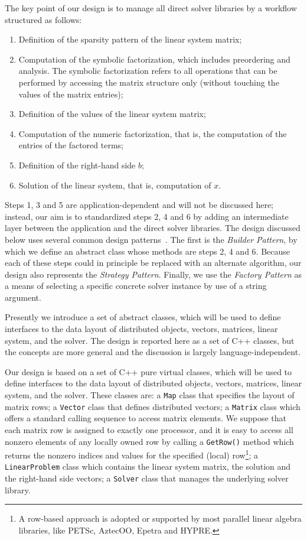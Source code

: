 \documentclass{llncs}
\begin{document}
The key point of our design is to manage all direct solver libraries by a
workflow structured as follows:
\begin{enumerate}
\item Definition of the sparsity pattern of the linear system matrix;
\item Computation of the symbolic factorization, which includes
preordering and analysis. The
symbolic factorization refers to all operations that can be performed by
accessing the matrix structure only (without touching the values of the matrix entries);
\item Definition of the values of the linear system matrix;
\item Computation of the numeric factorization, that is, the computation
of the entries of the factored terms;
\item Definition of the right-hand side $b$;
\item Solution of the linear system, that is, computation of $x$.
\end{enumerate}
Steps 1, 3 and 5 are application-dependent and will not be discussed
here; instead, our aim is to standardized steps 2, 4 and
6  by adding an intermediate layer between the application and
the direct solver libraries.  The design discussed below uses
several common design patterns~\cite{Gamma}.  The first is the
\textit{Builder Pattern}, by which we define an abstract class whose
methods are steps 2, 4 and 6.  Because each of these steps could in
principle be replaced with an alternate algorithm, our design also
represents the \textit{Strategy Pattern}. Finally, we use the
\textit{Factory Pattern} as a means of selecting a specific concrete
solver instance by use of a string argument.

Presently we introduce a set of abstract classes, which will be used
to define interfaces to the data layout of distributed objects,
vectors, matrices, linear system, and the solver. The design is
reported here as a set of C++ classes, but the concepts are more
general and the discussion is largely language-independent.

Our design is based on a set of C++ pure virtual classes, which will be
used to define interfaces to the data layout of distributed objects, 
vectors, matrices, linear system, and the solver. These classes are:
a {\tt Map} class that specifies the layout of matrix rows;
a {\tt Vector} class that defines distributed vectors;
a {\tt Matrix} class which offers a standard calling sequence to access
matrix elements. We suppose that each matrix row is assigned to exactly one
processor, and it is easy to access all nonzero elements
of any locally owned row by calling a {\tt GetRow()} method which returns the
nonzero indices and values for the specified (local) row\footnote{A row-based
approach is adopted or supported by most parallel linear algebra libraries, like PETSc,
AztecOO, Epetra and HYPRE.};
a {\tt LinearProblem} class which contains the linear system matrix, the
solution and the right-hand side vectors;
a {\tt Solver} class that manages the underlying solver library. 
\end{document}
